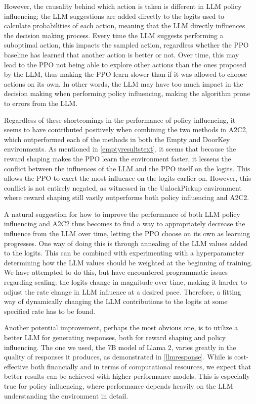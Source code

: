 \documentclass[conference]{IEEEtran}
\begin{document}
However, the causality behind which action is taken is different in LLM policy influencing; the LLM suggestions are added directly to the logits used to calculate probabilities of each action, meaning that the LLM directly influences the decision making process. Every time the LLM suggests performing a suboptimal action, this impacts the sampled action, regardless whether the PPO baseline has learned that another action is better or not. Over time, this may lead to the PPO not being able to explore other actions than the ones proposed by the LLM, thus making the PPO learn slower than if it was allowed to choose actions on its own. In other words, the LLM may have too much impact in the decision making when performing policy influencing, making the algorithm prone to errors from the LLM.

Regardless of these shortcomings in the performance of policy influencing, it seems to have contributed positively when combining the two methods in A2C2, which outperformed each of the methods in both the Empty and DoorKey environments. As mentioned in \ref{emptyresultstext}, it seems that because the reward shaping makes the PPO learn the environment faster, it lessens the conflict between the influences of the LLM and the PPO itself on the logits. This allows the PPO to exert the most influence on the logits earlier on. However, this conflict is not entirely negated, as witnessed in the UnlockPickup environment where reward shaping still vastly outperforms both policy influencing and A2C2.

A natural suggestion for how to improve the performance of both LLM policy influencing and A2C2 thus becomes to find a way to appropriately decrease the influence from the LLM over time, letting the PPO choose on its own as learning progresses. One way of doing this is through annealing of the LLM values added to the logits. This can be combined with experimenting with a hyperparameter determining how the LLM values should be weighted at the beginning of training. We have attempted to do this, but have encountered programmatic issues regarding scaling; the logits change in magnitude over time, making it harder to adjust the rate change in LLM influence at a desired pace. Therefore, a fitting way of dynamically changing the LLM contributions to the logits at some specified rate has to be found.

Another potential improvement, perhaps the most obvious one, is to utilize a better LLM for generating responses, both for reward shaping and policy influencing. The one we used, the 7B model of Llama 2, varies greatly in the quality of responses it produces, as demonstrated in \ref{llmresponse}. While is cost-effective both financially and in terms of computational resources, we expect that better results can be achieved with higher-performance models. This is especially true for policy influencing, where performance depends heavily on the LLM understanding the environment in detail.
\end{document}
